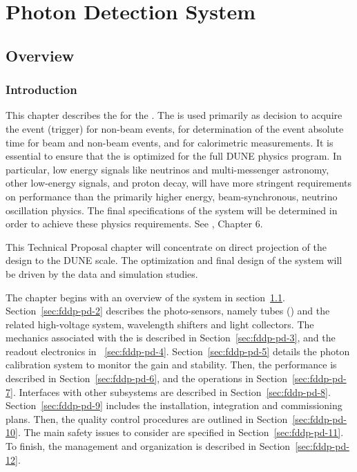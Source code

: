 \chapter{Photon Detection System}
\label{ch:fddp-pd}

\section{Overview}
\label{sec:fddp-pd-1}

\subsection{Introduction}
\label{sec:fddp-pd-1.1}

This chapter describes the  for the . The  is used primarily as decision to acquire the event (trigger) for non-beam events, for determination of the event absolute time for beam and non-beam events, and for calorimetric measurements. It is essential to ensure that the \dual {} is optimized for the full DUNE physics program. In particular, low energy signals like  neutrinos and multi-messenger astronomy, other low-energy signals, and proton decay, will have more stringent requirements on  performance than the primarily higher energy, beam-synchronous, neutrino oscillation physics. The final specifications of the system will be determined in order to achieve these physics requirements. See \voltitlespfd{}, Chapter 6.

This Technical Proposal chapter will concentrate on direct projection of the  design to the DUNE scale. The optimization and final design of the \dual {} system will be driven by the  \cite{protoDUNDP-tdr} data and simulation studies.

The chapter begins with an overview of the system in section~\ref{sec:fddp-pd-1}. Section~\ref{sec:fddp-pd-2} describes the photo-sensors, namely  tubes () and the related high-voltage system, wavelength shifters and light collectors. The mechanics associated with the  is described in Section~\ref{sec:fddp-pd-3}, and the readout electronics in ~\ref{sec:fddp-pd-4}. Section~\ref{sec:fddp-pd-5} details the photon calibration system to monitor the  gain and stability. Then, the  performance is described in Section~\ref{sec:fddp-pd-6}, and the operations in Section~\ref{sec:fddp-pd-7}. Interfaces with other subsystems are described in Section~\ref{sec:fddp-pd-8}. Section~\ref{sec:fddp-pd-9} includes the installation, integration and commissioning plans. Then, the quality control procedures are outlined in Section~\ref{sec:fddp-pd-10}. The main safety issues to consider are specified in Section~\ref{sec:fddp-pd-11}. To finish, the management and organization is described in Section~\ref{sec:fddp-pd-12}.

